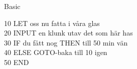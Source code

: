 \begin{song}{Basic}
	
	
	
	10 LET oss nu fatta i våra glas\\
	20 INPUT en klunk utav det som här has\\
	30 IF du fått nog THEN till 50 min vän\\
	40 ELSE GOTO-baka till 10 igen\\
	50 END
		
\end{song}
